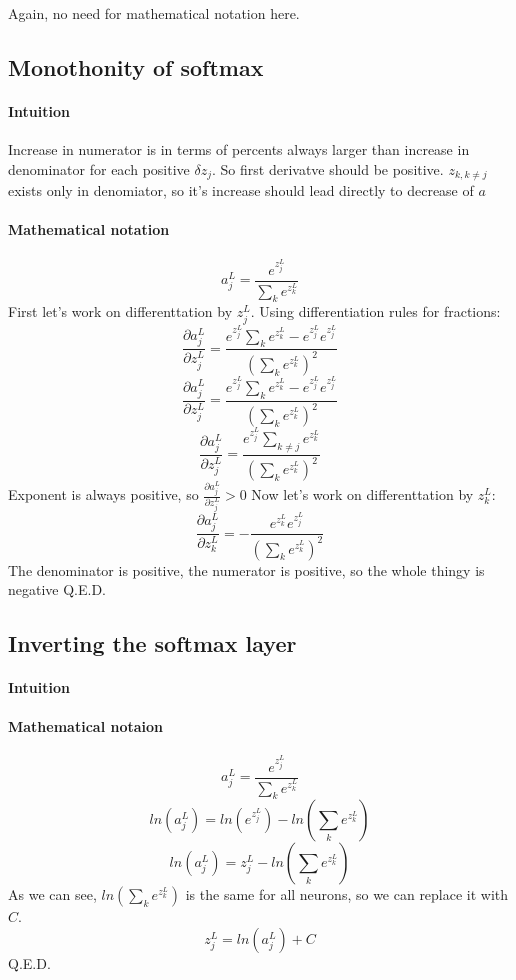 \documentclass{article}
\begin{document}
Again, no need for mathematical notation here.

\subsection{Monothonity of softmax}
\paragraph{Intuition}
Increase in numerator is in terms of percents always larger than increase in denominator for each positive $\delta z_j$.
So first derivatve should be positive. 
$z_{k, k \neq j}$ exists only in denomiator, so it's increase should lead directly to decrease of $a$
\paragraph{Mathematical notation}
$$a^L_j = \frac{e^{z^L_j}}{\sum_{k} e^{z^L_k}}$$
First let's work on differenttation by $z^L_j$.
Using differentiation rules for fractions:
$$\frac{\partial a^L_j}{\partial z^L_j} = \frac{e^{z^L_j} \sum_{k} e^{z^L_k} - e^{z^L_j} e^{z^L_j}}{(\sum_{k} e^{z^L_k})^2}$$
$$\frac{\partial a^L_j}{\partial z^L_j} = \frac{e^{z^L_j} \sum_{k} e^{z^L_k} - e^{z^L_j} e^{z^L_j}}{(\sum_{k} e^{z^L_k})^2}$$
$$\frac{\partial a^L_j}{\partial z^L_j} = \frac{e^{z^L_j} \sum_{k \neq j} e^{z^L_k}}{(\sum_{k} e^{z^L_k})^2}$$
Exponent is always positive, so $\frac{\partial a^L_j}{\partial z^L_j} > 0$
Now let's work on differenttation by $z^L_k$:
$$\frac{\partial a^L_j}{\partial z^L_k} = -\frac{e^{z^L_k} e^{z^L_j}}{(\sum_{k} e^{z^L_k})^2}$$
The denominator is positive, the numerator is positive, so the whole thingy is negative
Q.E.D.

\subsection{Inverting the softmax layer}
\paragraph{Intuition}
\paragraph{Mathematical notaion}
$$a^L_j = \frac{e^{z^L_j}}{\sum_{k} e^{z^L_k}}$$
$$ln(a^L_j) = ln(e^{z^L_j}) - ln(\sum_{k}e^{z^L_k})$$
$$ln(a^L_j) = z^L_j - ln(\sum_{k}e^{z^L_k})$$
As we can see, $ln(\sum_{k}e^{z^L_k})$ is the same for all neurons, so we can replace it with $C$.
$$z^L_j = ln(a^L_j) + C$$
Q.E.D.
\end{document}
